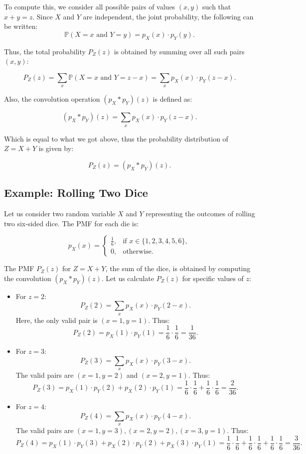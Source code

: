 \documentclass[12pt]{article}
\begin{document}
To compute this, we consider all possible pairs of values \( (x, y) \) such that \( x + y = z \). Since \( X \) and \( Y \) are independent, the joint probability, the following can be written: \\

\[
\mathbb{P}(X = x \text{ and } Y = y) = p_X(x) \cdot p_Y(y).
\]

Thus, the total probability \( P_Z(z) \) is obtained by summing over all such pairs \( (x, y) \):

\[
P_Z(z) = \sum_{x} \mathbb{P}(X = x \text{ and } Y = z - x) = \sum_{x} p_X(x) \cdot p_Y(z - x).
\]

Also, the convolution operation \( (p_X * p_Y)(z) \) is defined as:

\[
(p_X * p_Y)(z) = \sum_{x} p_X(x) \cdot p_Y(z - x).
\]

Which is equal to what we got above, thus the probability distribution of \( Z = X + Y \) is given by:

\[
P_Z(z) = (p_X * p_Y)(z).
\]

\subsection*{Example: Rolling Two Dice}

Let us consider two random variable \( X \) and \( Y \) representing the outcomes of rolling two six-sided dice. The PMF for each die is:

\[
p_X(x) = 
\begin{cases} 
\frac{1}{6}, & \text{if } x \in \{1, 2, 3, 4, 5, 6\}, \\
0, & \text{otherwise}.
\end{cases}
\]

The PMF \( P_Z(z) \) for \( Z = X + Y \), the sum of the dice, is obtained by computing the convolution \( (p_X * p_Y)(z) \). Let us calculate \( P_Z(z) \) for specific values of \( z \):

\begin{itemize}
    \item For \( z = 2 \):
    \[
    P_Z(2) = \sum_{x} p_X(x) \cdot p_Y(2 - x).
    \]
    Here, the only valid pair is \( (x = 1, y = 1) \). Thus:
    \[
    P_Z(2) = p_X(1) \cdot p_Y(1) = \frac{1}{6} \cdot \frac{1}{6} = \frac{1}{36}.
    \]

    \item For \( z = 3 \):
    \[
    P_Z(3) = \sum_{x} p_X(x) \cdot p_Y(3 - x).
    \]
    The valid pairs are \( (x = 1, y = 2) \) and \( (x = 2, y = 1) \). Thus:
    \[
    P_Z(3) = p_X(1) \cdot p_Y(2) + p_X(2) \cdot p_Y(1) = \frac{1}{6} \cdot \frac{1}{6} + \frac{1}{6} \cdot \frac{1}{6} = \frac{2}{36}.
    \]

    \item For \( z = 4 \):
    \[
    P_Z(4) = \sum_{x} p_X(x) \cdot p_Y(4 - x).
    \]
    The valid pairs are \( (x = 1, y = 3), (x = 2, y = 2), (x = 3, y = 1) \). Thus:
    \[
    P_Z(4) = p_X(1) \cdot p_Y(3) + p_X(2) \cdot p_Y(2) + p_X(3) \cdot p_Y(1) = \frac{1}{6} \cdot \frac{1}{6} + \frac{1}{6} \cdot \frac{1}{6} + \frac{1}{6} \cdot \frac{1}{6} = \frac{3}{36}.
    \]
\end{itemize}
\end{document}
